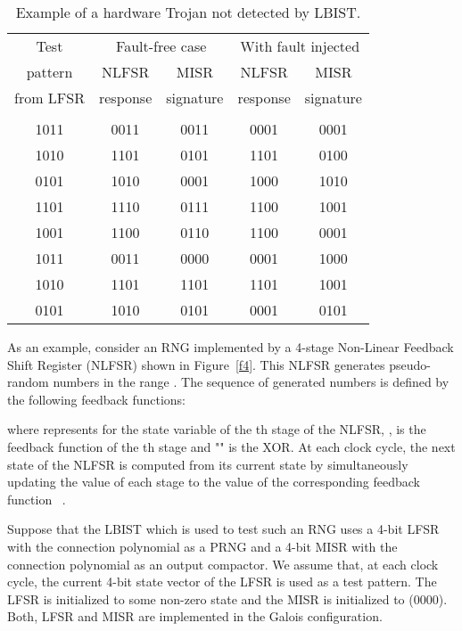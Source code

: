 \documentclass[a4paper]{llncs}
\begin{document}
\begin{table}[t!]
\begin{center}
\begin{tabular}{|c||c|c||c|c|}  \hline     
Test    & \multicolumn{2}{|c||}{Fault-free case} & \multicolumn{2}{c|}{With fault injected} \\ \cline{2-5}
pattern    & NLFSR         & MISR          & NLFSR         & MISR         \\ 
from LFSR    & response        & signature         & response        & signature         \\ 
 &  &  &  &   \\
\hline
1011  & 0011  & 0011  & 0001  & 0001  \\
1010  & 1101  & 0101  & 1101  & 0100  \\
0101  & 1010  & 0001  & 1000  & 1010  \\
1101  & 1110  & 0111  & 1100  & 1001  \\
1001  & 1100  & 0110  & 1100  & 0001  \\
1011  & 0011  & 0000  & 0001  & 1000  \\
1010  & 1101  & 1101  & 1101  & 1001  \\
0101  & 1010  &  {\cellcolor[gray]{0.9}} 0101 & 0001  & \cellcolor[gray]{0.9} 0101  \\ \hline
\end{tabular}
\end{center}
\caption{Example of a hardware Trojan not detected by LBIST.} \label{t1}
\end{table}



As an example, consider an RNG implemented by a 4-stage Non-Linear Feedback Shift Register (NLFSR)  shown in Figure~\ref{f4}. This NLFSR generates pseudo-random numbers in the range . The sequence of generated numbers is defined by the following feedback functions:

where  represents for the state variable of the th stage of the NLFSR, ,
 is the feedback function of the th stage and "" is the XOR. 
At each clock cycle, 
the next state of the NLFSR is computed from its current state 
by simultaneously updating the value of each stage 
to the value of the corresponding feedback function ~\cite{Du09j}.

Suppose that the LBIST which is used to test such an RNG uses a 4-bit LFSR with the connection polynomial  as a PRNG and a 4-bit MISR with the connection polynomial   as an output compactor. 
We assume that, at each clock cycle, the current 4-bit state vector of the LFSR is used as a test pattern. The LFSR is initialized to some non-zero state and the MISR is initialized to (0000).
Both, LFSR and MISR are implemented in the Galois configuration.
\end{document}

